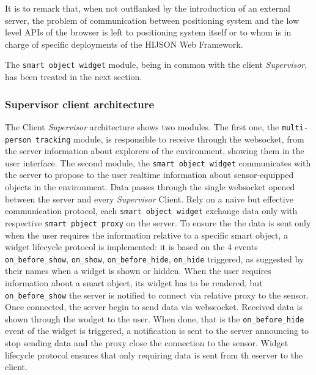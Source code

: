 It is to remark that, when not outflanked by the introduction of an external
server, the problem of communication between positioning system and the low
level APIs of the browser is left to positioning system itself or to whom is
in charge of specific deployments of the HIJSON Web Framework.

The {\tt smart\ object\ widget} module, being in common with the
client \emph{Supervisor}, has been treated in the next section.

\subsubsection{Supervisor client architecture}\label{supervisor-client-architecture}

The Client \emph{Supervisor} architecture shows two modules. The first
one, the {\tt multi-person\ tracking} module, is responsible to
receive through the websocket, from the server information about
explorers of the environment, showing them in the user interface. The
second module, the {\tt smart\ object\ widget} communicates with the
server to propose to the user realtime information about sensor-equipped
objects in the environment. Data passes through the single websocket
opened between the server and every \emph{Supervisor} Client. Rely on a
naive but effective communication protocol, each {\tt smart object widget}
exchange data only with respective {\tt smart pbject proxy} on the server. To
ensure the the data is sent only when the user requires the information
relative to a specific smart object, a widget lifecycle protocol is
implemented: it is based on the 4 events {\tt on\_before\_show},
{\tt on\_show}, {\tt on\_before\_hide}, {\tt on\_hide}
triggered, as suggested by their names when a widget is shown or hidden.
When the user requires information about a smart object, its widget has
to be rendered, but {\tt on\_before\_show} the server is notified to
connect via relative proxy to the sensor. Once connected, the server
begin to send data via webscocket. Received data is shown through the
wodget to the user. When done, that is the {\tt on\_before\_hide} event of the
widget is triggered, a notification is sent to the server announcing to stop sending
data and the proxy close the connection to the sensor. Widget lifecycle
protocol ensures that only requiring data is sent from th eserver to the
client.
